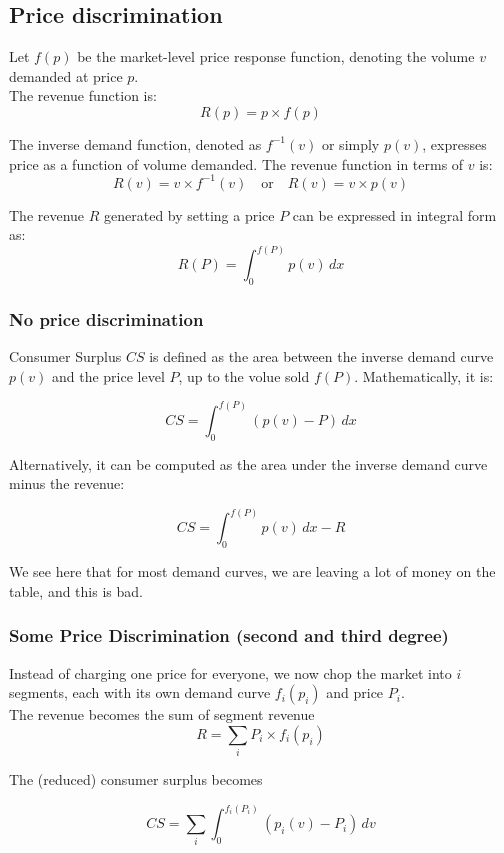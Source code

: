 \documentclass{article}
\begin{document}
\subsection{Price discrimination}

Let \( f(p) \) be the market-level price response function, denoting the volume \( v \) demanded at price \( p \). \\
The revenue function is:
\[
R(p) = p \times f(p)
\]

The inverse demand function, denoted as \( f^{-1}(v) \) or simply \( p(v) \), expresses price as a function of volume demanded. The revenue function in terms of \( v \) is:
\[
R(v) = v \times f^{-1}(v) \quad \text{or} \quad R(v) = v \times p(v)
\]

The revenue \( R \) generated by setting a price \( P \) can be expressed in integral form as:
\[
R(P) = \int_0^{f(P)} p(v) \, dx
\]

\subsubsection{No price discrimination}

Consumer Surplus \( CS \) is defined as the area between the inverse demand curve \( p(v) \) and the price level \( P \), up to the volue sold \( f(P) \). Mathematically, it is:

\[
CS = \int_0^{f(P)} (p(v) - P) \, dx
\]

Alternatively, it can be computed as the area under the inverse demand curve minus the revenue:

\[
CS = \int_0^{f(P)} p(v) \, dx - R
\]

We see here that for most demand curves, we are leaving a lot of money on the table, and this is bad.



\subsubsection{Some Price Discrimination (second and third degree)}

Instead of charging one price for everyone, we now chop the market into $i$ segments, each with its own demand curve $f_i(p_i)$ and price $P_i$. \\

The revenue becomes the sum of segment revenue
\[
R = \sum_i P_i \times f_i(p_i)
 \]

The (reduced) consumer surplus becomes

\[
CS = \sum_i \int_0^{f_i(P_i)} (p_i(v) - P_i) \, dv 
\]
\end{document}
